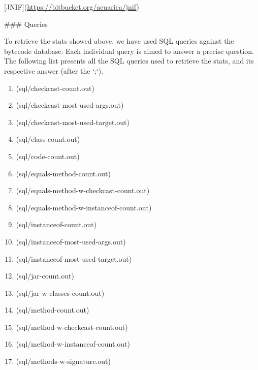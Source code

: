 \documentclass{usiinfdocprop}
\begin{document}
[JNIF](\url{https://bitbucket.org/acuarica/jnif}) 

\#\#\# Queries 

To retrieve the stats showed above, 
we have used SQL queries against the bytecode database. 
Each individual query is aimed to answer a precise question. 
The following list presents all the SQL queries used to retrieve the stats, 
and its respective answer (after the `;`). 

\begin{enumerate}
\item{}(sql/checkcast-count.out)
\label{sec:org73434e9}
\item{}(sql/checkcast-most-used-args.out)
\label{sec:org11f79e5}
\item{}(sql/checkcast-most-used-target.out)
\label{sec:org8af056a}
\item{}(sql/class-count.out)
\label{sec:org296e0e1}
\item{}(sql/code-count.out)
\label{sec:org42a88b4}
\item{}(sql/equals-method-count.out)
\label{sec:org863b025}
\item{}(sql/equals-method-w-checkcast-count.out)
\label{sec:org5d64cc5}
\item{}(sql/equals-method-w-instanceof-count.out)
\label{sec:org1f42d6e}
\item{}(sql/instanceof-count.out)
\label{sec:orgf789f5d}
\item{}(sql/instanceof-most-used-args.out)
\label{sec:orga81841d}
\item{}(sql/instanceof-most-used-target.out)
\label{sec:org545e09b}
\item{}(sql/jar-count.out)
\label{sec:org7bdee61}
\item{}(sql/jar-w-classes-count.out)
\label{sec:orga0de959}
\item{}(sql/method-count.out)
\label{sec:org5b58bd8}
\item{}(sql/method-w-checkcast-count.out)
\label{sec:org7d1f17e}
\item{}(sql/method-w-instanceof-count.out)
\label{sec:org06bc895}
\item{}(sql/methods-w-signature.out)
\label{sec:org64899a1}
\end{enumerate}
\end{document}
